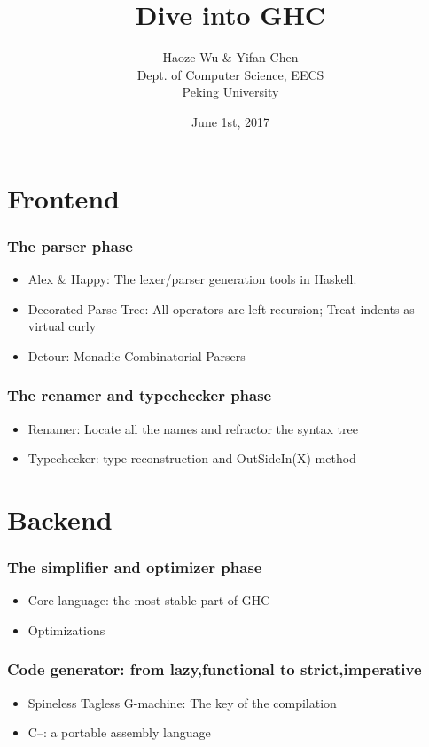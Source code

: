 \documentclass{beamer}
\title{Dive into GHC}
\author{Haoze Wu \& Yifan Chen \\
	Dept. of Computer Science, EECS \\
	Peking University
}
\date{June 1st, 2017}
\begin{document}
	\begin{frame}
		\titlepage
	\end{frame}

\section{Frontend}
 \begin{frame}
 	\frametitle{The parser phase}
 	\begin{itemize}
 		\item 
 		Alex \& Happy: The lexer/parser generation tools in Haskell.
 		\item Decorated Parse Tree: All operators are left-recursion; Treat indents as virtual curly
 		\item Detour: Monadic Combinatorial Parsers
 	\end{itemize}
 \end{frame}
 \begin{frame}
 	\frametitle{The renamer and typechecker phase}
 	\begin{itemize}
 		\item Renamer: Locate all the names and refractor the syntax tree
 		\item Typechecker: type reconstruction and OutSideIn(X) method
 	\end{itemize}
 \end{frame}
\section{Backend}
 \begin{frame}
 	\frametitle{The simplifier and optimizer phase}
 	\begin{itemize}
 		\item Core language: the most stable part of GHC
 		\item Optimizations
 	\end{itemize}
 \end{frame}
 \begin{frame}
 	\frametitle{Code generator: from lazy,functional to strict,imperative}
 	\begin{itemize}
 		\item Spineless Tagless G-machine: The key of the compilation
 		\item C--: a portable assembly language
 	\end{itemize} 
 \end{frame}
\end{document}
